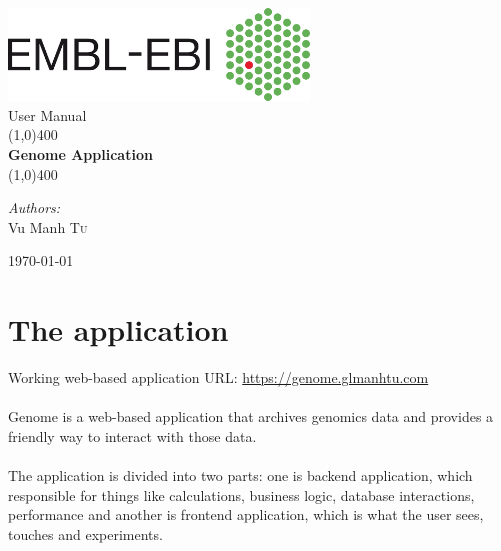 \documentclass[a4paper,12pt]{article}
\begin{document}
\begin{titlepage}
	\begin{center}
\includegraphics[width=0.6\textwidth]{images/Ebi_official_logo}\\[1cm]

{\Large User Manual}\\[0.5cm]	
	
	\line(1,0){400}\\[0.2in]
	\huge{\bfseries Genome Application}\\
	\line(1,0){400}\\[1.5cm]
	\noindent	
	

	
		\begin{center} \large
    	\emph{Authors:}\\
    	Vu Manh \textsc{Tu}\\
		\end{center}

\vfill

{\large \today}
	\end{center}
\end{titlepage}

\tableofcontents
\thispagestyle{empty}
\clearpage

\section{The application}
Working web-based application URL: \url{https://genome.glmanhtu.com}\\\\
Genome is a web-based application that archives genomics data and provides a friendly way to interact with those data.\\\\
The application is divided into two parts: one is backend application, which responsible for things like calculations, business logic, database interactions, performance and another is frontend application, which is what the user sees, touches and experiments.
\end{document}
